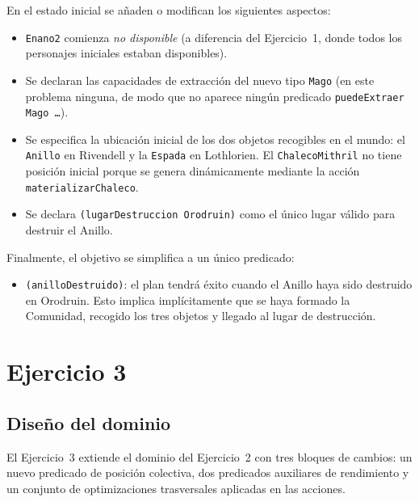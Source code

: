 \documentclass[10pt]{article}
\begin{document}
En el estado inicial se añaden o modifican los siguientes aspectos:
\begin{itemize}[label=-]
    \item \texttt{Enano2} comienza \emph{no disponible} (a diferencia del Ejercicio~1, donde todos los personajes iniciales estaban disponibles).
    \item Se declaran las capacidades de extracción del nuevo tipo \texttt{Mago} (en este problema ninguna, de modo que no aparece ningún predicado \texttt{puedeExtraer Mago \ldots}).
    \item Se especifica la ubicación inicial de los dos objetos recogibles en el mundo: el \texttt{Anillo} en Rivendell y la \texttt{Espada} en Lothlorien. El \texttt{ChalecoMithril} no tiene posición inicial porque se genera dinámicamente mediante la acción \texttt{materializarChaleco}.
    \item Se declara \texttt{(lugarDestruccion Orodruin)} como el único lugar válido para destruir el Anillo.
\end{itemize}

Finalmente, el objetivo se simplifica a un único predicado:
\begin{itemize}[label=-]
    \item \texttt{(anilloDestruido)}: el plan tendrá éxito cuando el Anillo haya sido destruido en Orodruin. Esto implica implícitamente que se haya formado la Comunidad, recogido los tres objetos y llegado al lugar de destrucción.
\end{itemize}

\section{Ejercicio 3}

\subsection{Diseño del dominio}

El Ejercicio~3 extiende el dominio del Ejercicio~2 con tres bloques de cambios: un nuevo predicado de posición colectiva, dos predicados auxiliares de rendimiento y un conjunto de optimizaciones trasversales aplicadas en las acciones.\\
\end{document}
